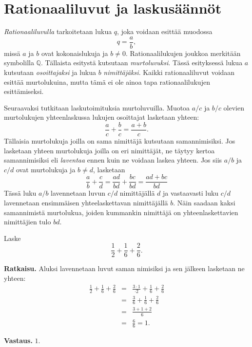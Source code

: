 \chapter{Rationaaliluvut ja laskusäännöt}

\emph{Rationaaliluvulla} tarkoitetaan lukua $q$, joka voidaan esittää muodossa
\[
q=\frac{a}{b}, 
\]
missä $a$ ja $b$ ovat kokonaislukuja ja $b\neq 0$. Rationaalilukujen joukkoa merkitään symbolilla $\mathbb{Q}$. Tällaista esitystä kutsutaan \emph{murtoluvuksi}. Tässä esityksessä lukua $a$ kutsutaan \emph{osoittajaksi} ja lukua $b$ \emph{nimittäjäksi}. Kaikki rationaaliluvut voidaan esittää murtolukuina, mutta tämä ei ole ainoa tapa rationaalilukujen esittämiseksi. 


Seuraavaksi tutkitaan laskutoimituksia murtoluvuilla. Muotoa $a/c$ ja $b/c$ olevien murtolukujen yhteenlaskussa lukujen osoittajat lasketaan yhteen:
\[
\frac{a}{c} + \frac{b}{c} = \frac{a+b}{c}.
\]
Tällaisia murtolukuja joilla on sama nimittäjä kutsutaan samannimisiksi. Jos lasketaan yhteen murtolukuja joilla on eri nimittäjät, ne täytyy kertoa samannimisiksi eli \emph{laventaa} ennen kuin ne voidaan laskea yhteen. Jos siis $a/b$ ja $c/d$ ovat murtolukuja ja $b\neq d$, lasketaan
\[
\frac{a}{b} + \frac{c}{d} = \frac{ad}{bd} + \frac{bc}{bd} = \frac{ad+bc}{bd}
\]
Tässä luku $a/b$ lavennetaan luvun $c/d$ nimittäjällä $d$ ja vastaavasti luku $c/d$ lavennetaan ensimmäisen yhteelaskettavan nimittäjällä $b$. Näin saadaan kaksi samannimistä murtolukua, joiden kummankin nimittäjä on yhteenlaskettavien nimittäjien tulo $bd$.

\begin{esimerkki}
Laske
\[
\frac{1}{2} + \frac{1}{6} + \frac{2}{6}.
\]

{\bf Ratkaisu.}
Aluksi lavennetaan luvut saman nimisiksi ja sen jälkeen lasketaan ne yhteen:
\begin{eqnarray*}
\frac{1}{2} + \frac{1}{6} + \frac{2}{6}
&=&
\frac{3\cdot 1}{\cdot 2} + \frac{1}{6} + \frac{2}{6}\\
&=&
\frac{3}{6} + \frac{1}{6} + \frac{2}{6}\\
&=& \frac{3+1+2}{6}\\ &=& \frac{6}{6} = 1.
\end{eqnarray*}

{\bf Vastaus.} $1$.

\end{esimerkki}

